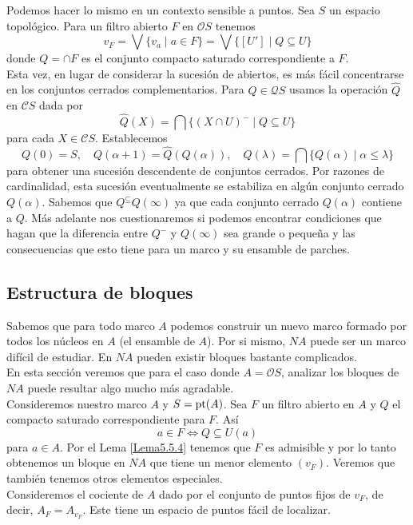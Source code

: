 Podemos hacer lo mismo en un contexto sensible a puntos. Sea $S$ un espacio topológico. Para un filtro abierto $F$ en $\mathcal{O}S$ tenemos 
\[
v_F=\bigvee\{v_a\mid a\in F\}=\bigvee\{[U']\mid Q\subseteq U\}
\]
donde $Q=\cap F$ es el conjunto compacto saturado correspondiente a $F$.\\

Esta vez, en lugar de considerar la sucesión de abiertos, es más fácil concentrarse en los conjuntos cerrados complementarios. Para $Q\in \mathcal{Q}S$ usamos la operación $\hat{Q}$ en $\mathcal{C}S$ dada por 
\[
\hat{Q}(X)=\bigcap\{(X\cap U)^-\mid Q\subseteq U\}
\]
para cada $X\in \mathcal{C}S$. Establecemos
\[
Q(0)=S,\quad Q(\alpha +1)=\hat{Q}(Q(\alpha)), \quad Q(\lambda)=\bigcap\{Q(\alpha)\mid \alpha\leq \lambda\}
\]
para obtener una sucesión descendente de conjuntos cerrados. Por razones de cardinalidad, esta sucesión eventualmente se estabiliza en algún conjunto cerrado $Q(\alpha)$. Sabemos que $Q^\subseteq Q(\infty)$ ya que cada conjunto cerrado $Q(\alpha)$ contiene a $Q$. Más adelante nos cuestionaremos si podemos encontrar condiciones que hagan que la diferencia entre $Q^-$ y $Q(\infty)$ sea grande o pequeña y las consecuencias que esto tiene para un marco y su ensamble de parches.

\subsection{Estructura de bloques}

Sabemos que para todo marco $A$ podemos construir un nuevo marco formado por todos los núcleos en $A$ (el ensamble de $A$). Por si mismo, $NA$ puede ser un marco difícil de estudiar. En $NA$ pueden existir bloques bastante complicados.\\

En esta sección veremos que para el caso donde $A=\mathcal{O}S$, analizar los bloques de $NA$ puede resultar algo mucho más agradable.\\

Consideremos nuestro marco $A$ y $S=\mathrm{pt}(A)$. Sea $F$ un filtro abierto en $A$ y $Q$ el compacto saturado correspondiente para $F$. Así 
\[
a\in F\Leftrightarrow Q\subseteq U(a)
\]
para $a\in A$. Por el Lema \ref{Lema5.5.4} tenemos que $F$ es admisible y por lo tanto obtenemos un bloque en $NA$ que tiene un menor elemento $(v_F)$. Veremos que también tenemos otros elementos especiales.\\

Consideremos el cociente de $A$ dado por el conjunto de puntos fijos de $v_F$, de decir, $A_F=A_{v_F}$. Este tiene un espacio de puntos fácil de localizar.

